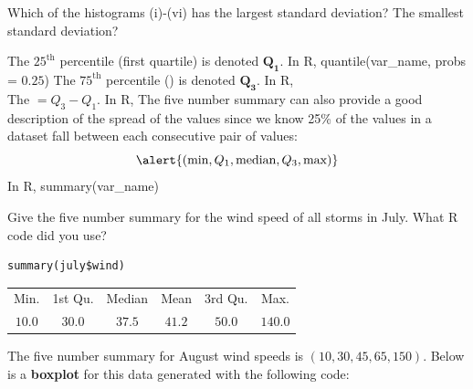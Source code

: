 \vfill

\ii Which of the histograms (i)-(vi) has the largest standard deviation? The smallest standard deviation?



\vfill
\ee

\clearpage


\bbox
\bi
\ii  The $25^{\mbox{th}}$ percentile (\alert{first quartile}) is denoted $\mathbf{Q_1}$.  In R, \alert{quantile(var\_name, probs = $0.25$)}
\ii  The $75^{\mbox{th}}$ percentile (\textbf{}) is denoted $\mathbf{Q_3}$.  In R,\\ \textbf{}
 \ii The \textbf{}$=Q_3-Q_1$. In R, \textbf{}
\ii The \alert{five number summary} can also provide a good description of the spread of the values since we know 25\% of the values
in a dataset fall between each consecutive pair of values:
\[  \alert{(\mbox{min}, Q_1 , \mbox{median}, Q_3, \mbox{max} )} \]
 In R, \alert{summary(var\_name)}
\ei
\ebox

\bb[resume]
\ii Give the five number summary for the wind speed of all storms in July.  What R code did you use?


\begin{multicols}{2}

\begin{lstlisting}
summary(july$wind)
\end{lstlisting}

\columnbreak

\begin{tabular}{cccccc}
Min. & 1st Qu.  & Median   & Mean & 3rd Qu. &   Max.\\ 
$10.0$ & $30.0$ &  $37.5$  & $41.2$  & $50.0$  & $140.0$
\end{tabular}

\end{multicols}


\ee


The five number summary for August wind speeds is $(10, 30, 45, 65, 150)$. Below is a \textbf{boxplot} for
this data generated with the following code:



